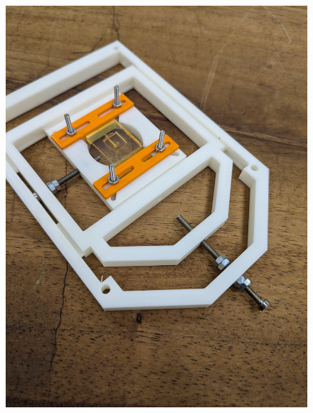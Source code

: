 \documentclass[runningheads]{llncs}
\begin{document}
\begin{figure}[h!]

\end{figure}

\begin{figure}[h]
    \centering
    \begin{minipage}[b]{0.45\textwidth}
    \centering
    \includegraphics[width=\linewidth]{images/slide_holder_complete.jpg}
    \end{minipage}
    \hfill
    \begin{minipage}[b]{0.45\textwidth}
    \centering

\end{minipage}
\end{figure}
\end{document}
